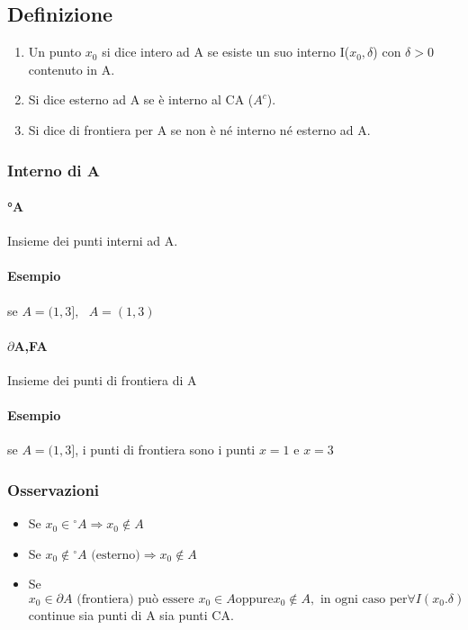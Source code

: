 \subsection{Definizione}

\begin{enumerate}
	\item Un punto $x_0$ si dice intero ad A se esiste un suo interno I($x_0,\delta$)
con $\delta>0$ contenuto in A.
	\item Si dice esterno ad A se è interno al CA ($A^c$).
	\item Si dice di frontiera per A se non è né interno né esterno ad A.
\end{enumerate}
\clearpage

\subsubsection{Interno di A}

\paragraph{°A} Insieme dei punti interni ad A.
\paragraph{Esempio} se $A=(1,3],\text{ }A=(1,3)$
\paragraph{$\partial$A,FA} Insieme dei punti di frontiera di A
\paragraph{Esempio} se $A=(1,3]$, i punti di frontiera sono i punti $x=1$ e
$x=3$

\subsubsection{Osservazioni}
\begin{itemize}
	\item Se $x_0\in {^\circ A}\Rightarrow x_0\notin A$
	\item Se $x_0\notin {^\circ A} \text{ (esterno)} \Rightarrow x_0\notin A$
	\item Se $x_0\in\partial A \text{ (frontiera) può essere }x_0\in A \text{
			oppure} x_0 \notin A, \text{ in ogni caso per} \forall
		I(x_0.\delta) $ continue sia punti di A sia punti CA.
\end{itemize}

